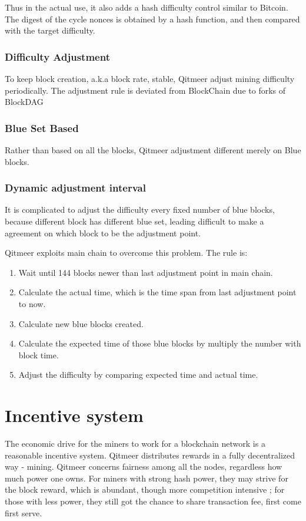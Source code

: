\documentclass[a4paper,11pt]{article}
\begin{document}
Thus in the actual use, it also adds a hash difficulty control similar to Bitcoin. The digest of the cycle nonces is obtained by a hash function,
and then compared with the target difficulty.

\subsubsection{Difficulty Adjustment}
To keep block creation, a.k.a block rate, stable, Qitmeer adjust mining difficulty periodically. 
The adjustment rule is deviated from BlockChain due to forks of BlockDAG

\subsubsection*{Blue Set Based}
Rather than based on all the blocks, Qitmeer adjustment different merely on Blue blocks. 

\subsubsection*{Dynamic adjustment interval}
It is complicated to adjust the difficulty every fixed number of blue blocks, because different block has different blue set, leading difficult to make a agreement on which block to be the adjustment point.

Qitmeer exploits main chain to overcome this problem. The rule is:

\begin{enumerate}
	\item  Wait until 144 blocks newer than last adjustment point in main chain.
    \item  Calculate the actual time, which is the time span from last adjustment point to now.
    \item  Calculate new blue blocks created.
    \item  Calculate the expected time of those blue blocks by multiply the number with block time.
    \item  Adjust the difficulty by comparing expected time and actual time.
\end{enumerate}



\section{Incentive system}
The economic drive for the miners to work for a blockchain network is a reasonable incentive system. Qitmeer distributes rewards in a fully decentralized way - mining. Qitmeer concerns fairness among all the nodes, regardless how much power one owns. For miners with strong hash power, they may strive for the block reward, which is abundant, though more competition intensive ; for those with less power, they still got the chance to share transaction fee, first come first serve.
\end{document}
